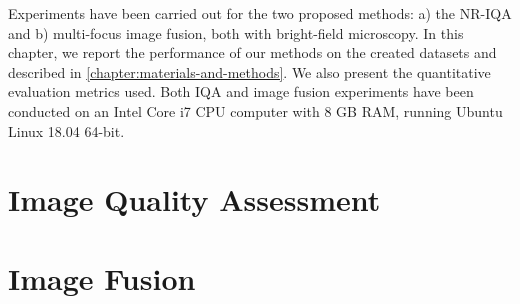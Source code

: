 Experiments have been carried out for the two proposed methods: a) the NR-IQA  and b) multi-focus image fusion, both with bright-field microscopy. In this chapter, we report the performance of our methods on the created datasets and described in \autoref{chapter:materials-and-methods}. We also present the quantitative evaluation metrics used. Both IQA and image fusion experiments have been conducted on an Intel Core i7 CPU computer with 8 GB RAM, running Ubuntu Linux 18.04 64-bit.



\section{Image Quality Assessment}


\section{Image Fusion}


